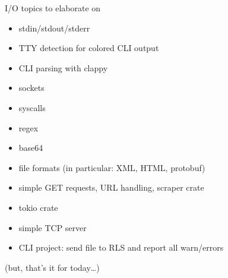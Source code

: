 \documentclass{beamer}
\begin{document}
\begin{frame}[fragile]{I/O topics to elaborate on}
  \begin{itemize}
    \item stdin/stdout/stderr
    \item TTY detection for colored CLI output
    \item CLI parsing with clappy
    \item sockets
    \item syscalls
    \item regex
    \item base64
    \item file formats (in particular: XML, HTML, protobuf)
    \item simple GET requests, URL handling, scraper crate
    \item tokio crate
    \item simple TCP server
    \item CLI project: send file to RLS and report all warn/errors
  \end{itemize}
  (but, that's it for today\dots)
\end{frame}


\end{document}
